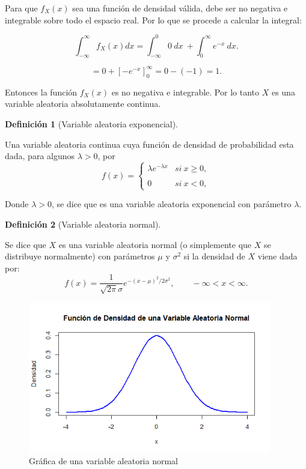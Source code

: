 \documentclass[
  us-letterpaper,
]{scrreprt}
\theoremstyle{plain}
\theoremstyle{plain}
\theoremstyle{definition}
\newtheorem{definition}{Definición}[chapter]
\theoremstyle{remark}
\begin{document}
\begin{tcolorbox}
Para que \(f_X(x)\) sea una función de densidad válida, debe ser no
negativa e integrable sobre todo el espacio real. Por lo que se procede
a calcular la integral:

\[
\int_{-\infty}^{\infty}f_X(x)dx = \int_{-\infty}^{0} 0 \ dx \ + \int_{0}^{\infty} e^{-x} \ dx.
\]

\[
= 0 + [-e^{-x}]_{0}^{\infty} = 0 -(-1) = 1.
\]

Entonces la función \(f_X(x)\) es no negativa e integrable. Por lo tanto
\(X\) es una variable aleatoria absolutamente continua.

\end{tcolorbox}

\begin{definition}[Variable aleatoria
exponencial]\protect\hypertarget{def-var_ale_exp}{}\label{def-var_ale_exp}

Una variable aleatoria continua cuya función de densidad de probabilidad
esta dada, para algunos \(\lambda > 0\), por
\[f(x) = \left\{ \begin{array}{lcc}\lambda e^{-\lambda x} & si \ x\geq0, \\ \\ 0 & si \ x<0, \end{array} \right.\]

Donde \(\lambda >0\), se dice que es una variable aleatoria exponencial
con parámetro \(\lambda\).

\end{definition}

\begin{definition}[Variable aleatoria
normal]\protect\hypertarget{def-var_ale_norm}{}\label{def-var_ale_norm}

Se dice que \(X\) es una variable aleatoria normal (o simplemente que
\(X\) se distribuye normalmente) con parámetros \(\mu\) y \(\sigma^2\)
si la densidad de \(X\) viene dada por:
\[f(x) = \frac{1}{\sqrt{2\pi}\sigma} e^{-(x - \mu)^2/2\sigma^2}, \qquad -\infty < x < \infty.\]

\begin{figure}[H]

{\centering \includegraphics[width=10.6cm,height=\textheight,keepaspectratio]{normal.png}

}

\caption{Gráfica de una variable aleatoria normal}

\end{figure}%

\end{definition}
\end{document}
